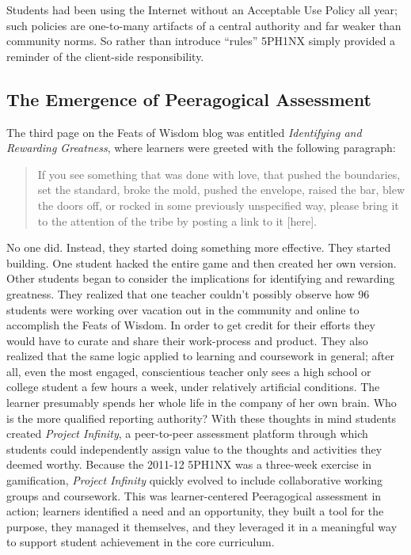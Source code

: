 \medskip

Students had been using the Internet without an Acceptable Use Policy
all year; such policies are one-to-many artifacts of a central
authority and far weaker than community norms. So rather than
introduce ``rules'' 5PH1NX simply provided a reminder of the
client-side responsibility.

\subsection{The Emergence of Peeragogical Assessment}

The third page on the Feats of Wisdom blog was entitled
\emph{Identifying and Rewarding Greatness}, where learners were greeted
with the following paragraph:

\begin{quote}
If you see something that was done with love, that pushed the
boundaries, set the standard, broke the mold, pushed the envelope,
raised the bar, blew the doors off, or rocked in some previously
unspecified way, please bring it to the attention of the tribe by
posting a link to it {[}here{]}.
\end{quote}

No one did. Instead, they started doing something more effective. They
started building. One student hacked the entire game and then created
her own version. Other students began to consider the implications for
identifying and rewarding greatness. They realized that one teacher
couldn't possibly observe how 96 students were working over vacation out
in the community and online to accomplish the Feats of Wisdom. In order
to get credit for their efforts they would have to curate and share
their work-process and product. They also realized that the same logic
applied to learning and coursework in general; after all, even the most
engaged, conscientious teacher only sees a high school or college
student a few hours a week, under relatively artificial conditions. The
learner presumably spends her whole life in the company of her own
brain. Who is the more qualified reporting authority? With these
thoughts in mind students created \emph{Project Infinity}, a
peer-to-peer assessment platform through which students could
independently assign value to the thoughts and activities they deemed
worthy. Because the 2011-12 5PH1NX was a three-week exercise in
gamification, \emph{Project Infinity} quickly evolved to include
collaborative working groups and coursework. This was learner-centered
Peeragogical assessment in action; learners identified a need and an
opportunity, they built a tool for the purpose, they managed it
themselves, and they leveraged it in a meaningful way to support student
achievement in the core curriculum.

